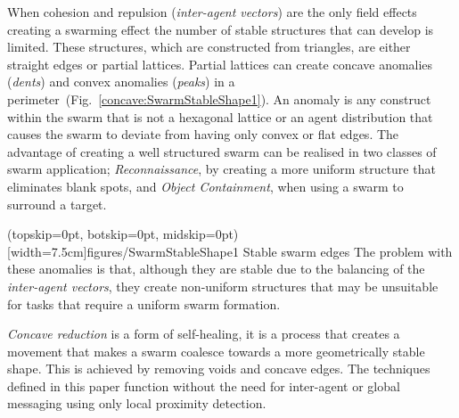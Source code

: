 \documentclass{ieeeaccess}
\begin{document}
When cohesion and repulsion (\textit{inter-agent vectors}) are the only field effects creating a swarming effect the number of stable structures that can develop is limited. These structures, which are constructed from triangles, are either straight edges or partial lattices. Partial lattices can create concave anomalies (\textit{dents}) and convex anomalies (\textit{peaks}) in a perimeter~(Fig.~\ref{concave:SwarmStableShape1}). An anomaly is any construct within the swarm that is not a hexagonal lattice or an agent distribution that causes the swarm to deviate from having only convex or flat edges. The advantage of creating a well structured swarm can be realised in two classes of swarm application; \textit{Reconnaissance}, by creating a more uniform structure that eliminates blank spots, and \textit{Object Containment}, when using a swarm to surround a target.  

\Figure[t!](topskip=0pt, botskip=0pt, midskip=0pt)[width=7.5cm]{figures/SwarmStableShape1}
{Stable swarm edges\label{concave:SwarmStableShape1}}
The problem with these anomalies is that, although they are stable due to the balancing of the \textit{inter-agent vectors}, they create non-uniform structures that may be unsuitable for tasks that require a uniform swarm formation.

\textit{Concave reduction} is a form of self-healing, it is a process that creates a movement that makes a swarm coalesce towards a more geometrically stable shape. This is achieved by removing voids and concave edges. The techniques defined in this paper function without the need for inter-agent or global messaging using only local proximity detection.
\end{document}
